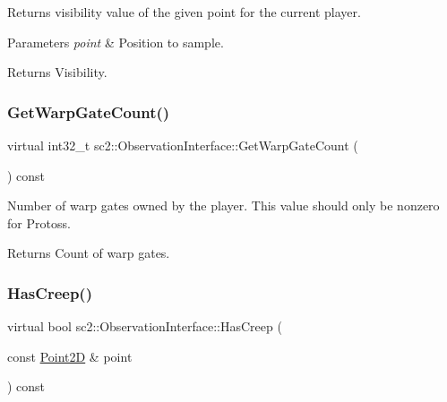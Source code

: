 Returns visibility value of the given point for the current player. 
\begin{DoxyParams}{Parameters}
{\em point} & Position to sample. \\
\hline
\end{DoxyParams}
\begin{DoxyReturn}{Returns}
Visibility. 
\end{DoxyReturn}
\mbox{\label{classsc2_1_1_observation_interface_ade7028b262089975621a18c54d4cddb3}} 
\subsubsection{\texorpdfstring{Get\+Warp\+Gate\+Count()}{GetWarpGateCount()}}
{\footnotesize\ttfamily virtual int32\+\_\+t sc2\+::\+Observation\+Interface\+::\+Get\+Warp\+Gate\+Count (\begin{DoxyParamCaption}{ }\end{DoxyParamCaption}) const\hspace{0.3cm}{\ttfamily [pure virtual]}}

Number of warp gates owned by the player. This value should only be nonzero for Protoss. \begin{DoxyReturn}{Returns}
Count of warp gates. 
\end{DoxyReturn}
\mbox{\label{classsc2_1_1_observation_interface_a155ebc1b654779ca8bd489d13d91d57c}} 
\subsubsection{\texorpdfstring{Has\+Creep()}{HasCreep()}}
{\footnotesize\ttfamily virtual bool sc2\+::\+Observation\+Interface\+::\+Has\+Creep (\begin{DoxyParamCaption}\item[{const \hyperlink{structsc2_1_1_point2_d}{Point2D} \&}]{point }\end{DoxyParamCaption}) const\hspace{0.3cm}{\ttfamily [pure virtual]}}

